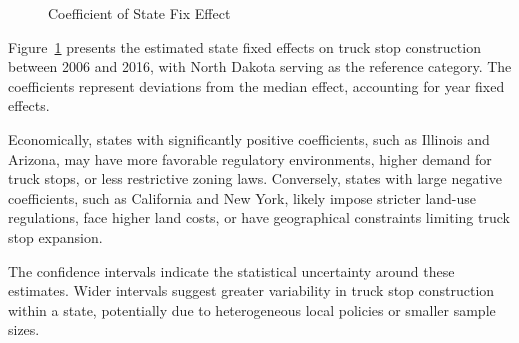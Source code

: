 \documentclass[
  8pt,
  12pt]{article}
\begin{document}
\begin{figure}


\caption{\label{fig-StateZoning}Coefficient of State Fix Effect}

\end{figure}%

Figure~\ref{fig-StateZoning} presents the estimated state fixed effects
on truck stop construction between 2006 and 2016, with North Dakota
serving as the reference category. The coefficients represent deviations
from the median effect, accounting for year fixed effects.

Economically, states with significantly positive coefficients, such as
Illinois and Arizona, may have more favorable regulatory environments,
higher demand for truck stops, or less restrictive zoning laws.
Conversely, states with large negative coefficients, such as California
and New York, likely impose stricter land-use regulations, face higher
land costs, or have geographical constraints limiting truck stop
expansion.

The confidence intervals indicate the statistical uncertainty around
these estimates. Wider intervals suggest greater variability in truck
stop construction within a state, potentially due to heterogeneous local
policies or smaller sample sizes.
\end{document}
